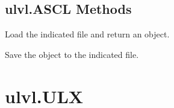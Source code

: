 \documentclass[letterpaper,10pt,english]{sphinxmanual}
\begin{document}
\subsection{ulvl.ASCL Methods}
\label{\detokenize{index:ulvl-ascl-methods}}

\begin{fulllineitems}
\label{\detokenize{index:ulvl.ASCL.load}}
Load the indicated file and return an {\hyperref[\detokenize{index:ulvl.ASCL}]{}} object.

\end{fulllineitems}


\begin{fulllineitems}
\label{\detokenize{index:ulvl.ASCL.save}}
Save the object to the indicated file.

\end{fulllineitems}



\section{ulvl.ULX}
\label{\detokenize{index:ulvl-ulx}}
\end{document}
